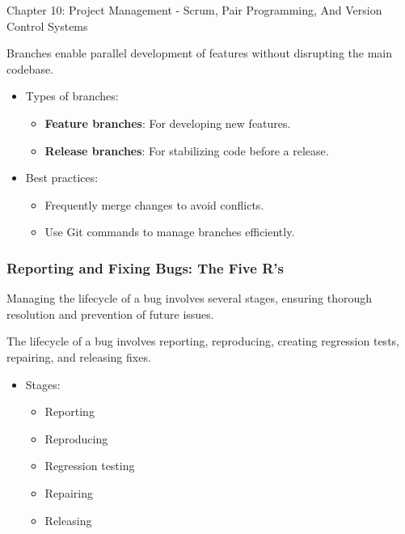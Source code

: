 \begin{notes}{Chapter 10: Project Management - Scrum, Pair Programming, And Version Control Systems}
\begin{highlight}
        Branches enable parallel development of features without disrupting the main codebase.
        
        \begin{itemize}
            \item Types of branches:
            \begin{itemize}
                \item \textbf{Feature branches}: For developing new features.
                \item \textbf{Release branches}: For stabilizing code before a release.
            \end{itemize}
            \item Best practices:
            \begin{itemize}
                \item Frequently merge changes to avoid conflicts.
                \item Use Git commands to manage branches efficiently.
            \end{itemize}
        \end{itemize}
    
    \end{highlight}
    
    \subsubsection*{Reporting and Fixing Bugs: The Five R's}
    
    Managing the lifecycle of a bug involves several stages, ensuring thorough resolution and prevention of future issues.
    
    \begin{highlight}
    
        The lifecycle of a bug involves reporting, reproducing, creating regression tests, repairing, and releasing fixes.
        
        \begin{itemize}
            \item Stages:
            \begin{itemize}
                \item Reporting
                \item Reproducing
                \item Regression testing
                \item Repairing
                \item Releasing
            \end{itemize}
        \end{itemize}
    

\end{highlight}
\end{notes}
